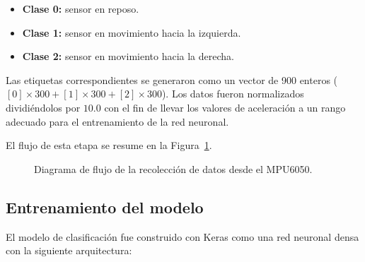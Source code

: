 \documentclass[conference]{IEEEtran}
\begin{document}
\begin{itemize}
    \item \textbf{Clase 0:} sensor en reposo.
    \item \textbf{Clase 1:} sensor en movimiento hacia la izquierda.
    \item \textbf{Clase 2:} sensor en movimiento hacia la derecha.
\end{itemize}

Las etiquetas correspondientes se generaron como un vector de 900 enteros ($[0]\times300 + [1]\times300 + [2]\times300$). Los datos fueron normalizados dividiéndolos por $10.0$ con el fin de llevar los valores de aceleración a un rango adecuado para el entrenamiento de la red neuronal.

El flujo de esta etapa se resume en la Figura~\ref{fig:flujo_datos}.

\begin{figure}[H]
\centering
{}
\caption{Diagrama de flujo de la recolección de datos desde el MPU6050.}
\label{fig:flujo_datos}
\end{figure}

\subsection{Entrenamiento del modelo}

El modelo de clasificación fue construido con Keras como una red neuronal densa con la siguiente arquitectura:
\end{document}
